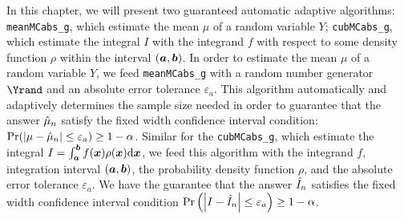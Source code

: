 \documentclass{iitthesis}
\theoremstyle{definition}
\begin{document}
In this chapter, we will present two guaranteed automatic adaptive algorithms: {\tt meanMCabs\_g}, which estimate the mean $\mu$ of a random variable $Y$; {\tt cubMCabs\_g}, which estimate the integral $I$ with the integrand $f$ with respect to some density function $\rho$ within the interval $(\boldsymbol{a},\boldsymbol{b})$. In order to estimate the mean $\mu$ of a random variable $Y$, we feed {\tt meanMCabs\_g} with a random number generator $\Yrand$ and an absolute error tolerance $\varepsilon_a$. This algorithm automatically and adaptively determines the sample size needed in order to guarantee that the answer $\hat{\mu}_n$ satisfy the fixed width confidence interval condition: $\Pr (\left \lvert \mu-\hat{\mu}_n \right \rvert \leq \varepsilon_a) \geq 1-\alpha$. Similar for the {\tt cubMCabs\_g}, which estimate the integral $I=\int_{\boldsymbol{a}}^{\boldsymbol{b}} f(\boldsymbol{x})\rho(\boldsymbol{x}){\rm d}\boldsymbol{x}$, we feed this algorithm with the integrand $f$, integration interval $(\boldsymbol{a},\boldsymbol{b})$, the probability density function $\rho$, and the absolute error tolerance $\varepsilon_a$. We have the guarantee that the answer $\hat{I}_n$ satisfies the fixed width confidence interval condition $\Pr \left(\left \lvert I-\hat{I}_n \right \rvert \leq \varepsilon_a\right) \geq 1-\alpha$.

 \label{sec:meanMCabsg}
\end{document}
